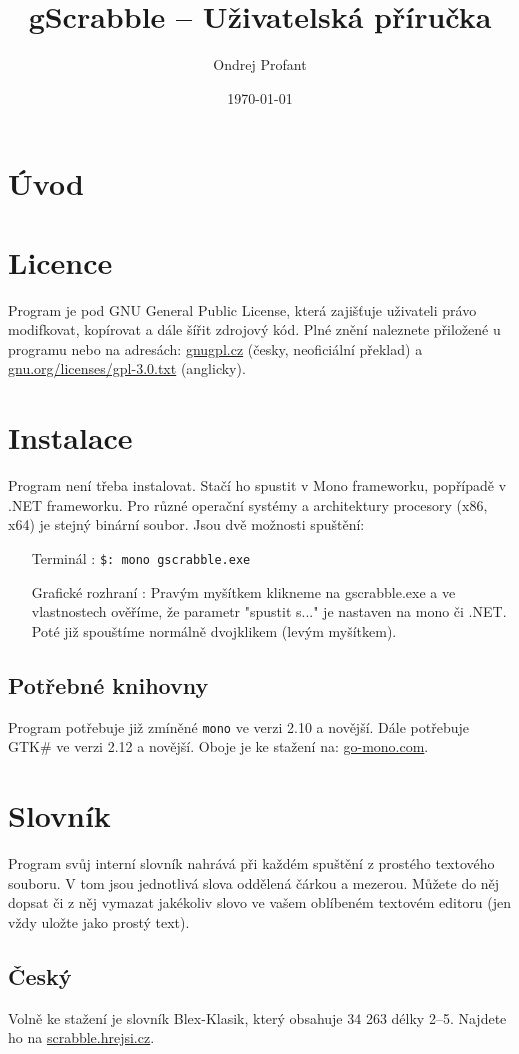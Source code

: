 \documentclass[a4paper]{article}
\title{gScrabble -- Uživatelská příručka}
\author{Ondrej Profant}
\date{\today}
\begin{document}
\tableofcontents	


\section{Úvod}
\section{Licence}
Program je pod GNU General Public License, která zajišťuje uživateli právo modifkovat, kopírovat a dále šířit zdrojový kód. Plné znění naleznete přiložené u programu nebo na adresách:
\href{http://www.gnugpl.cz/}{gnugpl.cz} (česky, neoficiální překlad) a \href{http://www.gnu.org/licenses/gpl-3.0.txt}{gnu.org/licenses/gpl-3.0.txt} (anglicky).

\section{Instalace}
Program není třeba instalovat. Stačí ho spustit v Mono frameworku, popřípadě v .NET frameworku. Pro různé operační systémy a architektury procesory (x86, x64) je stejný binární soubor.
Jsou dvě možnosti spuštění:
\begin{itemize}
\item[Terminál]: \texttt{\$: mono gscrabble.exe} 
\item[Grafické rozhraní]: Pravým myšítkem klikneme na gscrabble.exe a ve vlastnostech ověříme, že parametr "spustit s..." je nastaven na mono či .NET. Poté již spouštíme normálně dvojklikem (levým myšítkem).
\end{itemize}
\subsection{Potřebné knihovny}
Program potřebuje již zmíněné \texttt{mono} ve verzi 2.10 a novější. Dále potřebuje GTK\# ve verzi 2.12 a novější. Oboje je ke stažení na: \href{http://www.go-mono.com/mono-downloads}{go-mono.com}.
\section{Slovník}
Program svůj interní slovník nahrává při každém spuštění z prostého textového souboru. V tom jsou jednotlivá slova oddělená čárkou a mezerou. Můžete do něj dopsat či z něj vymazat jakékoliv slovo ve vašem oblíbeném textovém editoru (jen vždy uložte jako prostý text).
\subsection{Český}
Volně ke stažení je slovník Blex-Klasik, který obsahuje 34 263 délky 2--5. Najdete ho na \href{http://scrabble.hrejsi.cz/pravidla/blex.htm}{scrabble.hrejsi.cz}.
\end{document}
